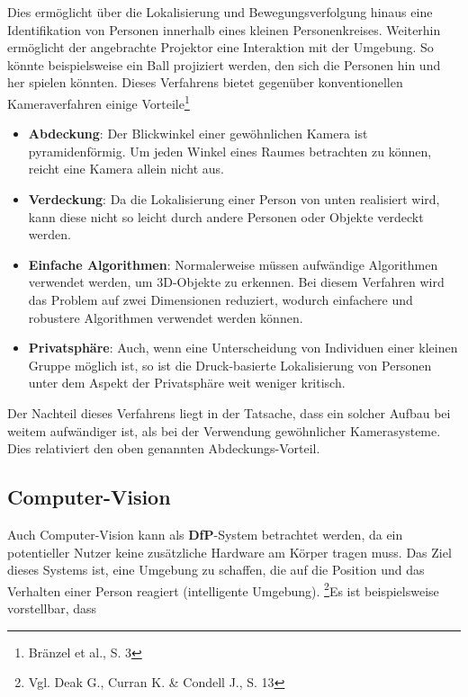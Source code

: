 Dies ermöglicht über die Lokalisierung und Bewegungsverfolgung hinaus eine Identifikation von Personen innerhalb eines kleinen Personenkreises. Weiterhin ermöglicht der angebrachte Projektor eine Interaktion mit der Umgebung. So könnte beispielsweise ein Ball projiziert werden, den sich die Personen hin und her spielen könnten.\newline\newline
Dieses Verfahrens bietet gegenüber konventionellen Kameraverfahren einige Vorteile\footnote{Bränzel et al., S. 3}

\begin{itemize}
\item \textbf{Abdeckung}: Der Blickwinkel einer gewöhnlichen Kamera ist pyramidenförmig. Um jeden Winkel eines Raumes betrachten zu können, reicht eine Kamera allein nicht aus. 
\item \textbf{Verdeckung}: Da die Lokalisierung einer Person von unten realisiert wird, kann diese nicht so leicht durch andere Personen oder Objekte verdeckt werden.
\item \textbf{Einfache Algorithmen}: Normalerweise müssen aufwändige Algorithmen verwendet werden, um 3D-Objekte zu erkennen. Bei diesem Verfahren wird das Problem auf zwei Dimensionen reduziert, wodurch einfachere und robustere Algorithmen verwendet werden können.
\item \textbf{Privatsphäre}: Auch, wenn eine Unterscheidung von Individuen einer kleinen Gruppe möglich ist, so ist die Druck-basierte Lokalisierung von Personen unter dem Aspekt der Privatsphäre weit weniger kritisch.
\end{itemize} 

Der Nachteil dieses Verfahrens liegt in der Tatsache, dass ein solcher Aufbau bei weitem aufwändiger ist, als bei der Verwendung gewöhnlicher Kamerasysteme. Dies relativiert den oben genannten Abdeckungs-Vorteil.

\subsection{Computer-Vision}
Auch Computer-Vision kann als \textbf{DfP}-System betrachtet werden, da ein potentieller Nutzer keine zusätzliche Hardware am Körper tragen muss. Das Ziel dieses Systems ist, eine Umgebung zu schaffen, die auf die Position und das Verhalten einer Person reagiert (intelligente Umgebung). \footnote{Vgl. Deak G., Curran K. \& Condell J., S. 13}\newline Es ist beispielsweise vorstellbar, dass 

